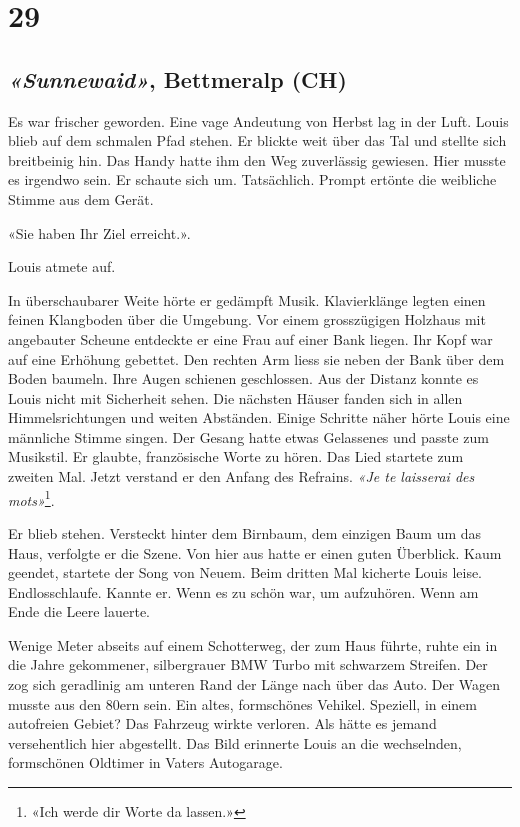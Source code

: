 \chapter{29}

\section[«Sunnewaid», Bettmeralp (CH)]{\emph{«Sunnewaid»}, Bettmeralp (CH)} 

Es war frischer geworden. Eine vage Andeutung von Herbst lag in der
Luft. Louis blieb auf dem schmalen Pfad stehen. Er blickte weit über das
Tal und stellte sich breitbeinig hin.
Das Handy hatte ihm den Weg zuverlässig gewiesen. Hier musste es
irgendwo sein. Er schaute sich um. Tatsächlich. Prompt ertönte die
weibliche Stimme aus dem Gerät.

«Sie haben Ihr Ziel erreicht.».

Louis atmete auf. 

In überschaubarer Weite hörte er gedämpft Musik. Klavierklänge legten einen
feinen Klangboden über die Umgebung. Vor einem grosszügigen Holzhaus mit
angebauter Scheune entdeckte er eine Frau auf einer Bank liegen. Ihr Kopf war
auf eine Erhöhung gebettet. Den rechten Arm liess sie neben der Bank über
dem Boden baumeln. Ihre Augen schienen geschlossen. Aus der Distanz
konnte es Louis nicht mit Sicherheit sehen. Die nächsten Häuser fanden
sich in allen Himmelsrichtungen und weiten Abständen.
Einige Schritte näher hörte Louis eine männliche Stimme singen. Der
Gesang hatte etwas Gelassenes und passte zum Musikstil. Er glaubte,
französische Worte zu hören. Das Lied startete zum zweiten Mal. Jetzt
verstand er den Anfang des Refrains. \emph{«Je te laisserai des mots»}\footnote{«Ich werde dir Worte da lassen.»}.


Er blieb stehen. Versteckt hinter dem Birnbaum, dem einzigen Baum
um das Haus, verfolgte er die Szene.
Von hier aus hatte er einen guten Überblick.
Kaum geendet, startete der Song von Neuem. Beim dritten Mal kicherte
Louis leise. Endlosschlaufe. Kannte er. Wenn es zu schön war, um
aufzuhören. Wenn am Ende die Leere lauerte.

Wenige Meter abseits auf einem Schotterweg, der zum Haus führte, ruhte
ein in die Jahre gekommener, silbergrauer BMW Turbo mit schwarzem
Streifen. Der zog sich geradlinig am unteren Rand der Länge nach über
das Auto. Der Wagen musste aus den 80ern sein. Ein altes, formschönes
Vehikel. Speziell, in einem autofreien Gebiet? Das Fahrzeug wirkte
verloren. Als hätte es jemand versehentlich hier abgestellt. Das Bild 
erinnerte Louis an die wechselnden, formschönen
Oldtimer in Vaters Autogarage.

